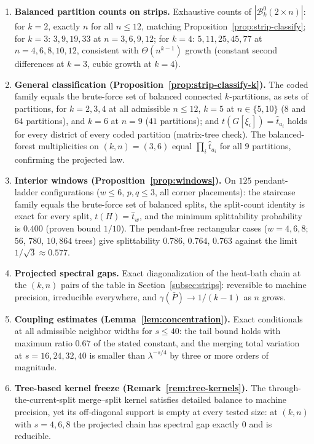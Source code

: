 \documentclass[11pt]{article}
\newcommand{\Bcal}{\mathcal{B}}
\begin{document}
\begin{enumerate}[1.]
    partition level and a warning at the lifted level.
  \item \textbf{Balanced partition counts on strips.} Exhaustive counts
    of $|\Bcal_k^0(2 \times n)|$: for $k = 2$, exactly $n$ for all
    $n \le 12$, matching Proposition~\ref{prop:strip-classify}; for
    $k = 3$: $3, 9, 19, 33$ at $n = 3, 6, 9, 12$; for $k = 4$:
    $5, 11, 25, 45, 77$ at $n = 4, 6, 8, 10, 12$, consistent with
    $\Theta(n^{k-1})$ growth (constant second differences at $k = 3$,
    cubic growth at $k = 4$).
  \item \textbf{General classification
    (Proposition~\ref{prop:strip-classify-k}).} The coded family equals
    the brute-force set of balanced connected $k$-partitions, as sets of
    partitions, for $k = 2, 3, 4$ at all admissible $n \le 12$, $k = 5$
    at $n \in \{5, 10\}$ ($8$ and $64$ partitions), and $k = 6$ at
    $n = 9$ ($41$ partitions); and $t(G[\xi_i]) = \hat t_{a_i}$ holds for
    every district of every coded partition (matrix-tree check). The
    balanced-forest multiplicities on $(k, n) = (3, 6)$ equal
    $\prod_i \hat t_{a_i}$ for all $9$ partitions, confirming the
    projected law.
  \item \textbf{Interior windows (Proposition~\ref{prop:windows}).} On
    $125$ pendant-ladder configurations ($w \le 6$, $p, q \le 3$, all
    corner placements): the staircase family equals the brute-force set
    of balanced splits, the split-count identity is exact for every
    split, $t(H) = \hat t_w$, and the minimum splittability probability
    is $0.400$ (proven bound $1/10$). The pendant-free rectangular cases
    ($w = 4, 6, 8$; $56$, $780$, $10{,}864$ trees) give splittability
    $0.786$, $0.764$, $0.763$ against the limit $1/\sqrt3 \approx
    0.577$.
  \item \textbf{Projected spectral gaps.} Exact diagonalization of
    the heat-bath chain at the $(k, n)$ pairs of the table in
    Section~\ref{subsec:strips}: reversible to machine precision,
    irreducible everywhere, and $\gamma(\bar P) \to 1/(k-1)$ as $n$
    grows.
  \item \textbf{Coupling estimates
    (Lemma~\ref{lem:concentration}).} Exact conditionals at all
    admissible neighbor widths for $s \le 40$: the tail bound holds with
    maximum ratio $0.67$ of the stated constant, and the merging total
    variation at $s = 16, 24, 32, 40$ is smaller than $\lambda^{-s/4}$
    by three or more orders of magnitude.
  \item \textbf{Tree-based kernel freeze
    (Remark~\ref{rem:tree-kernels}).} The through-the-current-split
    merge--split kernel satisfies detailed balance to machine precision,
    yet its off-diagonal support is empty at every tested size: at
    $(k, n)$ with $s = 4, 6, 8$ the projected chain has spectral gap
    exactly $0$ and is reducible.
\end{enumerate}
\end{document}
